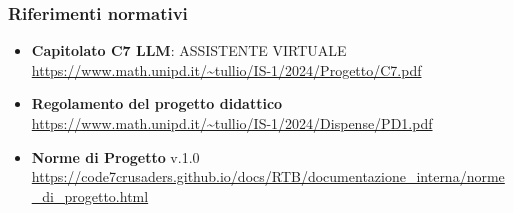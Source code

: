 \subsubsection{Riferimenti normativi}
\begin{itemize}
    \item \textbf{Capitolato C7 LLM}: ASSISTENTE VIRTUALE \\ \url{https://www.math.unipd.it/~tullio/IS-1/2024/Progetto/C7.pdf}
    \item \textbf{Regolamento del progetto didattico} \\ \url{https://www.math.unipd.it/~tullio/IS-1/2024/Dispense/PD1.pdf}
    \item \textbf{Norme di Progetto} v.1.0 \\ \url{https://code7crusaders.github.io/docs/RTB/documentazione_interna/norme_di_progetto.html}
\end{itemize}

